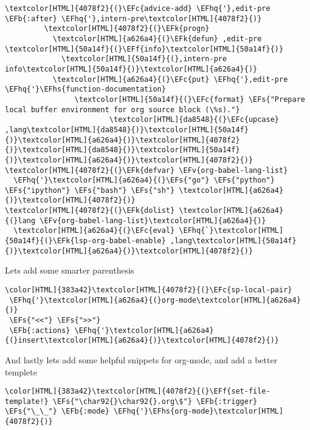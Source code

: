 \documentclass{scrartcl}
\newcommand{\EFk}[1]{\textcolor{EFk}{#1}} %
\newcommand{\EFs}[1]{\textcolor{EFs}{#1}} %
\newcommand{\EFb}[1]{\textcolor{EFb}{#1}} %
\newcommand{\EFc}[1]{\textcolor{EFc}{#1}} %
\newcommand{\EFv}[1]{\textcolor{EFv}{#1}} %
\newcommand{\EFf}[1]{\textcolor{EFf}{#1}} %
\newcommand{\EFhq}[1]{\textcolor{EFhq}{#1}} %
\newcommand{\EFhs}[1]{\textcolor{EFhs}{#1}} %
\begin{document}
\begin{Code}
\begin{Verbatim}[]
           \textcolor[HTML]{4078f2}{(}\EFc{advice-add} \EFhq{'},edit-pre \EFb{:after} \EFhq{'},intern-pre\textcolor[HTML]{4078f2}{)}
         \textcolor[HTML]{4078f2}{(}\EFk{progn}
           \textcolor[HTML]{a626a4}{(}\EFk{defun} ,edit-pre \textcolor[HTML]{50a14f}{(}\EFf{info}\textcolor[HTML]{50a14f}{)}
             \textcolor[HTML]{50a14f}{(},intern-pre info\textcolor[HTML]{50a14f}{)}\textcolor[HTML]{a626a4}{)}
           \textcolor[HTML]{a626a4}{(}\EFc{put} \EFhq{'},edit-pre \EFhq{'}\EFhs{function-documentation}
                \textcolor[HTML]{50a14f}{(}\EFc{format} \EFs{"Prepare local buffer environment for org source block (\%s)."}
                        \textcolor[HTML]{da8548}{(}\EFc{upcase} ,lang\textcolor[HTML]{da8548}{)}\textcolor[HTML]{50a14f}{)}\textcolor[HTML]{a626a4}{)}\textcolor[HTML]{4078f2}{)}\textcolor[HTML]{da8548}{)}\textcolor[HTML]{50a14f}{)}\textcolor[HTML]{a626a4}{)}\textcolor[HTML]{4078f2}{)}
\textcolor[HTML]{4078f2}{(}\EFk{defvar} \EFv{org-babel-lang-list}
  \EFhq{'}\textcolor[HTML]{a626a4}{(}\EFs{"go"} \EFs{"python"} \EFs{"ipython"} \EFs{"bash"} \EFs{"sh"} \textcolor[HTML]{a626a4}{)}\textcolor[HTML]{4078f2}{)}
\textcolor[HTML]{4078f2}{(}\EFk{dolist} \textcolor[HTML]{a626a4}{(}lang \EFv{org-babel-lang-list}\textcolor[HTML]{a626a4}{)}
  \textcolor[HTML]{a626a4}{(}\EFc{eval} \EFhq{`}\textcolor[HTML]{50a14f}{(}\EFk{lsp-org-babel-enable} ,lang\textcolor[HTML]{50a14f}{)}\textcolor[HTML]{a626a4}{)}\textcolor[HTML]{4078f2}{)}
\end{Verbatim}
\end{Code}

Lets add some smarter parenthesis
\begin{Code}
\begin{Verbatim}[]
\color[HTML]{383a42}\textcolor[HTML]{4078f2}{(}\EFc{sp-local-pair}
 \EFhq{'}\textcolor[HTML]{a626a4}{(}org-mode\textcolor[HTML]{a626a4}{)}
 \EFs{"<<"} \EFs{">>"}
 \EFb{:actions} \EFhq{'}\textcolor[HTML]{a626a4}{(}insert\textcolor[HTML]{a626a4}{)}\textcolor[HTML]{4078f2}{)}
\end{Verbatim}
\end{Code}

And lastly lets add some helpful snippets for org-mode, and add a better templete
\begin{Code}
\begin{Verbatim}[]
\color[HTML]{383a42}\textcolor[HTML]{4078f2}{(}\EFf{set-file-template!} \EFs{"\char92{}\char92{}.org\$"} \EFb{:trigger} \EFs{"\_\_"} \EFb{:mode} \EFhq{'}\EFhs{org-mode}\textcolor[HTML]{4078f2}{)}
\end{Verbatim}
\end{Code}
\end{document}
